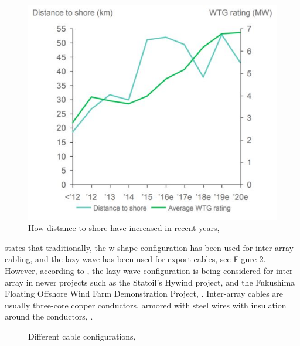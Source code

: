 \begin{figure}[H]
\centering
\includegraphics[scale=0.9]{figures/distshore}
\caption[$\; \:$Distance to shore ]{How distance to shore have increased in recent years, \cite{Make2016}}
 \label{fig:distshore}
\end{figure}

\noindent \cite{srinil2016} states that traditionally, the w shape configuration has been used for inter-array cabling, and the lazy wave has been used for export cables, see Figure \ref{fig:cableconfig}. However, according to \cite{ds2010}, the lazy wave configuration is being considered for inter-array in newer projects such as the Statoil's Hywind project, and the Fukushima Floating Offshore Wind
Farm Demonstration Project, \cite{yagihashi2015dynamic}. Inter-array cables are usually three-core copper conductors, armored with steel wires with insulation around the conductors, \cite{srinil2016}. 


\begin{figure}[H]
\hfill
{}\hfill
\caption[$\; \:$Cable configurations]{Different cable configurations, \cite{ds2010}}
\label{fig:cableconfig}
\end{figure}

